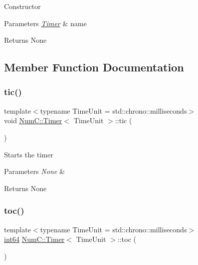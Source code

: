 Constructor


\begin{DoxyParams}{Parameters}
{\em \mbox{\hyperlink{class_num_c_1_1_timer}{Timer}}} & name\\
\hline
\end{DoxyParams}
\begin{DoxyReturn}{Returns}
None 
\end{DoxyReturn}


\subsection{Member Function Documentation}
\mbox{\label{class_num_c_1_1_timer_a3ed4a4706ea53f2144b112cb6f77447a}} 
\subsubsection{\texorpdfstring{tic()}{tic()}}
{\footnotesize\ttfamily template$<$typename Time\+Unit  = std\+::chrono\+::milliseconds$>$ \\
void \mbox{\hyperlink{class_num_c_1_1_timer}{Num\+C\+::\+Timer}}$<$ Time\+Unit $>$\+::tic (\begin{DoxyParamCaption}{ }\end{DoxyParamCaption})\hspace{0.3cm}{\ttfamily [inline]}}

Starts the timer


\begin{DoxyParams}{Parameters}
{\em None} & \\
\hline
\end{DoxyParams}
\begin{DoxyReturn}{Returns}
None 
\end{DoxyReturn}
\mbox{\label{class_num_c_1_1_timer_a0bbb8265474ec404013f6ce37cfdf71f}} 
\subsubsection{\texorpdfstring{toc()}{toc()}}
{\footnotesize\ttfamily template$<$typename Time\+Unit  = std\+::chrono\+::milliseconds$>$ \\
\mbox{\hyperlink{namespace_num_c_a96768695f3ea92cc3c4b79d37efb30c6}{int64}} \mbox{\hyperlink{class_num_c_1_1_timer}{Num\+C\+::\+Timer}}$<$ Time\+Unit $>$\+::toc (\begin{DoxyParamCaption}{ }\end{DoxyParamCaption})\hspace{0.3cm}{\ttfamily [inline]}}

